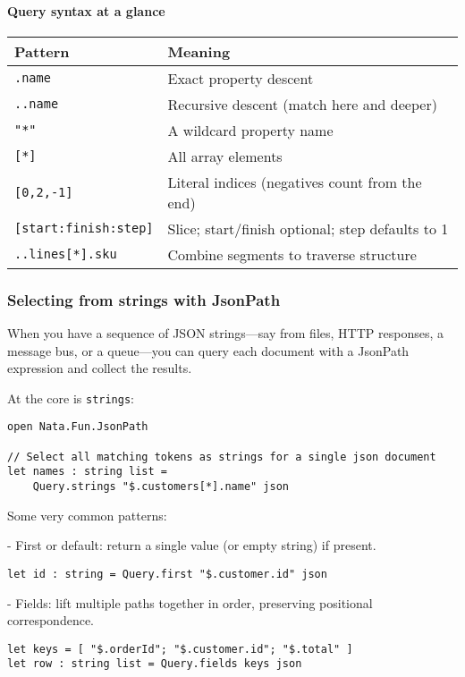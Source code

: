 \documentclass{article}
\begin{document}
\paragraph{Query syntax at a glance}
\begin{center}
\begin{tabular}{@{}ll@{}}
\textbf{Pattern} & \textbf{Meaning} \\
\hline
\texttt{.name} & Exact property descent \\
\texttt{..name} & Recursive descent (match here and deeper) \\
\texttt{"*"} & A wildcard property name \\
\texttt{[*]} & All array elements \\
\texttt{[0,2,-1]} & Literal indices (negatives count from the end) \\
\texttt{[start:finish:step]} & Slice; start/finish optional; step defaults to 1 \\
\texttt{..lines[*].sku} & Combine segments to traverse structure \\
\end{tabular}
\end{center}

\subsubsection{Selecting from strings with JsonPath}

When you have a sequence of JSON strings—say from files, HTTP responses, a message bus, or a queue—you can query each document with a JsonPath expression and collect the results.

At the core is \texttt{strings}:

\begin{verbatim}
open Nata.Fun.JsonPath

// Select all matching tokens as strings for a single json document
let names : string list =
    Query.strings "$.customers[*].name" json
\end{verbatim}

Some very common patterns:

- First or default: return a single value (or empty string) if present.
\begin{verbatim}
let id : string = Query.first "$.customer.id" json
\end{verbatim}

- Fields: lift multiple paths together in order, preserving positional correspondence.
\begin{verbatim}
let keys = [ "$.orderId"; "$.customer.id"; "$.total" ]
let row : string list = Query.fields keys json
\end{verbatim}
\end{document}
